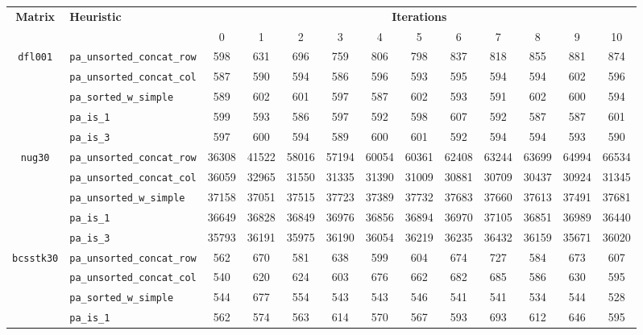 \begin{table}
	\centering
	\renewcommand{\arraystretch}{1.2}
	\begin{tabular}{|c|l|c||c|c|c|c|c|c|c|c|c|c|}
		\hline
		\multirow{2}{*}{\textbf{Matrix}} &\multirow{2}{*}{\textbf{Heuristic}} & \multicolumn{11}{c|}{\textbf{Iterations}} \\ \cline{3-13} 
		&& 0 & 1 & 2 & 3 & 4 & 5 & 6 & 7 & 8 & 9 & 10 \\ \hline
		\multirow{5}{*}{\texttt{dfl001}}		&\verb|pa_unsorted_concat_row| & 598 & 631 & 696 & 759 & 806 & 798 & 837 & 818 & 855 & 881 & 874 \\ 
		&\verb|pa_unsorted_concat_col| &  587&  590 & 594 & 586 & 596 & 593 & 595 & 594 & 594 & 602 & 596 \\ 
		&\verb|pa_sorted_w_simple| & 589 & 602 & 601 & 597 & 587 & 602 & 593 & 591 & 602 & 600 & 594 \\
		&\verb|pa_is_1| & 599 & 593 & 586 & 597 & 592 & 598 & 607 & 592 & 587 & 587  & 601 \\
		&\verb|pa_is_3| & 597 & 600 & 594 & 589 & 600 & 601 & 592 & 594 & 594 & 593 & 590 \\
		\hline
		\multirow{5}{*}{\texttt{nug30}}		&\verb|pa_unsorted_concat_row| & 	36308 & 41522 & 58016 & 57194 & 60054 & 60361 & 62408 & 63244 & 63699 & 64994 & 66534 \\ 
		&\verb|pa_unsorted_concat_col| & 36059 & 32965&  31550 & 31335 & 31390 & 31009 & 30881 & 30709 & 30437 & 30924 & 31345 \\
		&\verb|pa_unsorted_w_simple| & 37158 & 37051 & 37515 & 37723 & 37389 & 37732 & 37683 & 37660 & 37613 & 37491 & 37681 \\
		&\verb|pa_is_1| & 	36649 & 36828 & 36849 & 36976 & 36856 & 36894 & 36970 & 37105 & 36851 & 36989 & 36440 \\
		&\verb|pa_is_3| & 35793 & 36191 & 35975 & 36190 & 36054 & 36219 & 36235 & 36432 & 36159 & 35671 & 36020 \\ \hline
		\multirow{5}{*}{\texttt{bcsstk30}}		&\verb|pa_unsorted_concat_row| &  562 & 670 & 581&  638 &  599 &  604 &  674 &  727&   584&   673 &  607 \\ 
		&\verb|pa_unsorted_concat_col| & 540 &  620 & 624 & 603 & 676 & 662 & 682 & 685 & 586 & 630 & 595 \\ 
		&\verb|pa_sorted_w_simple| &544 & 677 & 554 & 543 & 543 & 546 & 541 & 541 & 534 & 544 & 528 \\
		&\verb|pa_is_1| & 562 & 574 & 563 & 614 & 570 & 567 & 593 & 693 & 612 & 646 & 595 \\

\end{tabular}
\end{table}
